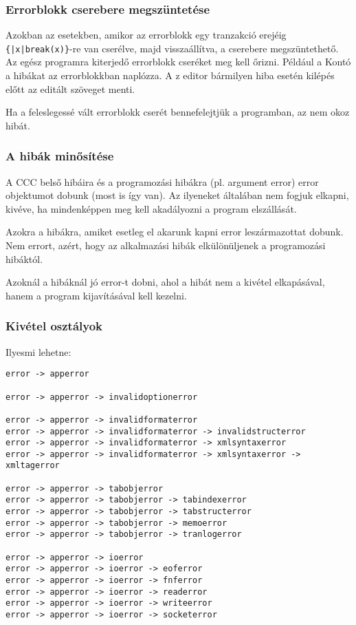 \subsubsection{Errorblokk cserebere megszüntetése}

Azokban az esetekben, amikor az errorblokk egy tranzakció erejéig 
\verb!{|x|break(x)}!-re van cserélve, majd visszaállítva, a cserebere 
megszüntethető.  
Az egész programra kiterjedő errorblokk cseréket meg kell őrizni.
Például a Kontó a hibákat az errorblokkban naplózza. A z editor bármilyen 
hiba esetén kilépés előtt az editált szöveget menti. 

Ha a feleslegessé vált errorblokk cserét bennefelejtjük a programban,
az nem okoz hibát.


\subsubsection{A hibák minősítése}

A CCC belső hibáira és a programozási hibákra (pl. argument error)
error objektumot dobunk (most is így van). Az ilyeneket általában
nem fogjuk elkapni, kivéve, ha mindenképpen meg kell akadályozni
a program elszállását.

Azokra a hibákra, amiket esetleg el akarunk kapni error leszármazottat 
dobunk. Nem errort, azért, hogy  az alkalmazási hibák elkülönüljenek 
a programozási hibáktól.

Azoknál a hibáknál jó error-t dobni, ahol a hibát nem a kivétel
elkapásával, hanem a program kijavításával kell kezelni.


\subsubsection{Kivétel osztályok}

Ilyesmi lehetne:

\begin{verbatim}
error -> apperror

error -> apperror -> invalidoptionerror

error -> apperror -> invalidformaterror
error -> apperror -> invalidformaterror -> invalidstructerror
error -> apperror -> invalidformaterror -> xmlsyntaxerror
error -> apperror -> invalidformaterror -> xmlsyntaxerror -> xmltagerror

error -> apperror -> tabobjerror
error -> apperror -> tabobjerror -> tabindexerror
error -> apperror -> tabobjerror -> tabstructerror
error -> apperror -> tabobjerror -> memoerror
error -> apperror -> tabobjerror -> tranlogerror

error -> apperror -> ioerror
error -> apperror -> ioerror -> eoferror
error -> apperror -> ioerror -> fnferror
error -> apperror -> ioerror -> readerror
error -> apperror -> ioerror -> writeerror
error -> apperror -> ioerror -> socketerror
\end{verbatim}

